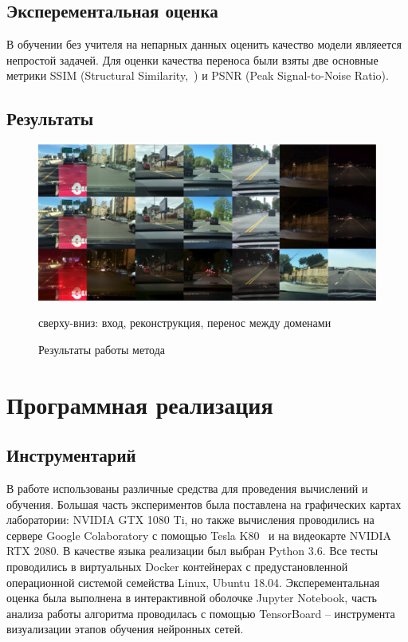 \documentclass[11pt,a4paper]{extarticle}
\begin{document}
{	\subsection{Эксперементальная оценка}

		В обучении без учителя на непарных данных оценить качество модели являеется непростой задачей.
		Для оценки качества переноса были взяты две основные метрики SSIM (Structural Similarity,~\cite{metric:ssim}) и PSNR (Peak Signal-to-Noise Ratio).
		
		
			
			
	\newpage
	\subsection{Результаты}\label{sec:results}
		\begin{figure}[ht]
			\centering
			\includegraphics[width=\textwidth]{img/results}
			\caption{Результаты работы метода}{
				\small{
					сверху-вниз: вход, реконструкция, перенос между доменами
				}
			}
		\end{figure}

\newpage
\section{Программная реализация}\label{sec:prac}

	\subsection{Инструментарий}\label{sec:tools}

		В работе использованы различные средства для проведения вычислений и обучения.
		Большая часть экспериментов была поставлена на графических картах лаборатории: NVIDIA GTX 1080 Ti, но также вычисления проводились на сервере Google Colaboratory с помощью Tesla K80~\cite{colab} и на видеокарте NVIDIA RTX 2080.
		В качестве языка реализации был выбран Python 3.6.
		Все тесты проводились в виртуальных Docker контейнерах с предустановленной операционной системой семейства Linux, Ubuntu 18.04.
		Эксперементальная оценка была выполнена в интерактивной оболочке Jupyter Notebook, часть анализа работы алгоритма проводилась с помощью TensorBoard -- инструмента визуализации этапов обучения нейронных сетей.

}
\end{document}
